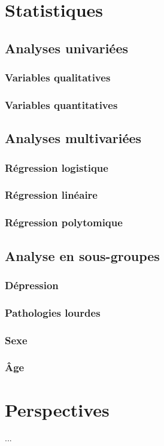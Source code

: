 \documentclass{book}
\begin{document}
\newpage
\section{Statistiques}
\subsection{Analyses univariées}
\subsubsection{Variables qualitatives}
\subsubsection{Variables quantitatives}
\subsection{Analyses multivariées}
\subsubsection{Régression logistique}
\subsubsection{Régression linéaire}
\subsubsection{Régression polytomique}
\subsection{Analyse en sous-groupes}
\subsubsection{Dépression}
\subsubsection{Pathologies lourdes}
\subsubsection{Sexe}
\subsubsection{Âge}

\newpage
\section{Perspectives}
...
\end{document}

